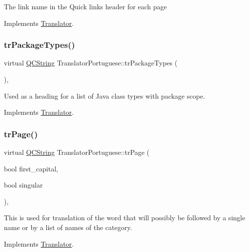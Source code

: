 The link name in the Quick links header for each page 

Implements \mbox{\hyperlink{class_translator}{Translator}}.

\mbox{\label{class_translator_portuguese_af7256682a5025c429603f8797c6b69a3}} 
\subsubsection{\texorpdfstring{trPackageTypes()}{trPackageTypes()}}
{\footnotesize\ttfamily virtual \mbox{\hyperlink{class_q_c_string}{Q\+C\+String}} Translator\+Portuguese\+::tr\+Package\+Types (\begin{DoxyParamCaption}{ }\end{DoxyParamCaption})\hspace{0.3cm}{\ttfamily [inline]}, {\ttfamily [virtual]}}

Used as a heading for a list of Java class types with package scope. 

Implements \mbox{\hyperlink{class_translator}{Translator}}.

\mbox{\label{class_translator_portuguese_a27eeda494bdc419a1d5c1d39a2d1864c}} 
\subsubsection{\texorpdfstring{trPage()}{trPage()}}
{\footnotesize\ttfamily virtual \mbox{\hyperlink{class_q_c_string}{Q\+C\+String}} Translator\+Portuguese\+::tr\+Page (\begin{DoxyParamCaption}\item[{bool}]{first\+\_\+capital,  }\item[{bool}]{singular }\end{DoxyParamCaption})\hspace{0.3cm}{\ttfamily [inline]}, {\ttfamily [virtual]}}

This is used for translation of the word that will possibly be followed by a single name or by a list of names of the category. 

Implements \mbox{\hyperlink{class_translator}{Translator}}.

